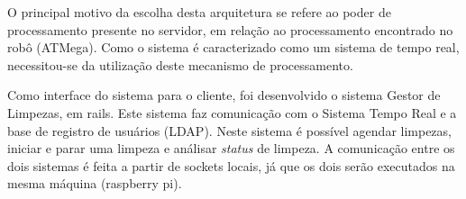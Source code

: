 O principal motivo da escolha desta arquitetura se refere ao poder de processamento presente no servidor, em relação ao processamento encontrado no robô (ATMega). Como o sistema é caracterizado como um sistema de tempo real, necessitou-se da utilização deste mecanismo de processamento.

Como interface do sistema para o cliente, foi desenvolvido o sistema Gestor de Limpezas, em rails. Este sistema faz comunicação com o Sistema Tempo Real e a base de registro de usuários (LDAP). Neste sistema é possível agendar limpezas, iniciar e parar uma limpeza e análisar \textit{status} de limpeza. A comunicação entre os dois sistemas é feita a partir de sockets locais, já que os dois serão executados na mesma máquina (raspberry pi).